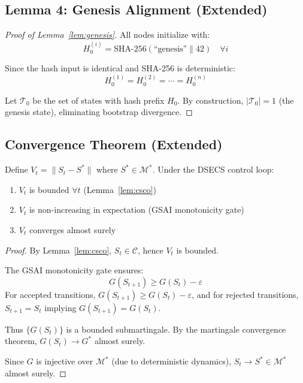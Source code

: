 \subsection{Lemma 4: Genesis Alignment (Extended)}

\begin{proof}[Proof of Lemma~\ref{lem:genesis}]
All nodes initialize with:
\[
H_0^{(i)} = \text{SHA-256}(\text{``genesis''} \| 42) \quad \forall i
\]

Since the hash input is identical and SHA-256 is deterministic:
\[
H_0^{(1)} = H_0^{(2)} = \cdots = H_0^{(n)}
\]

Let $\mathcal{T}_0$ be the set of states with hash prefix $H_0$.
By construction, $|\mathcal{T}_0| = 1$ (the genesis state), eliminating
bootstrap divergence.
\end{proof}

\subsection{Convergence Theorem (Extended)}

\begin{theorem}
Define $V_t = \|S_t - S^*\|$ where $S^* \in \mathcal{M}^*$.
Under the DSECS control loop:
\begin{enumerate}
    \item $V_t$ is bounded $\forall t$ (Lemma~\ref{lem:csco})
    \item $V_t$ is non-increasing in expectation (GSAI monotonicity gate)
    \item $V_t$ converges almost surely
\end{enumerate}
\end{theorem}

\begin{proof}
By Lemma~\ref{lem:csco}, $S_t \in \mathcal{C}$, hence $V_t$ is bounded.

The GSAI monotonicity gate ensures:
\[
G(S_{t+1}) \geq G(S_t) - \varepsilon
\]
For accepted transitions, $G(S_{t+1}) \geq G(S_t) - \varepsilon$,
and for rejected transitions, $S_{t+1} = S_t$ implying $G(S_{t+1}) = G(S_t)$.

Thus $\{G(S_t)\}$ is a bounded submartingale.
By the martingale convergence theorem, $G(S_t) \to G^*$ almost surely.

Since $G$ is injective over $\mathcal{M}^*$ (due to deterministic dynamics),
$S_t \to S^* \in \mathcal{M}^*$ almost surely.
\end{proof}

